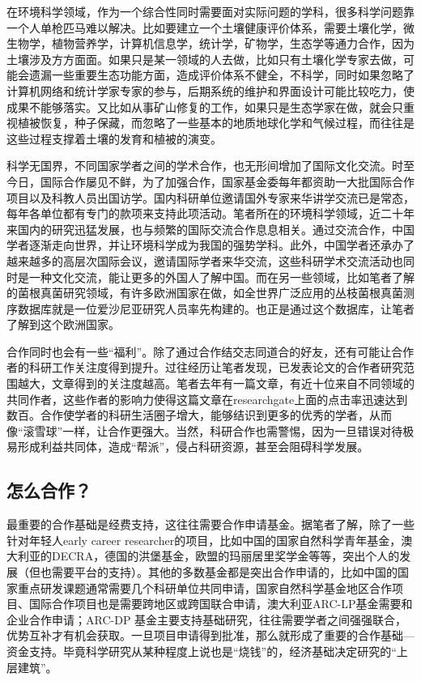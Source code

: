 \documentclass[
]{book}
\begin{document}
在环境科学领域，作为一个综合性同时需要面对实际问题的学科，很多科学问题靠一个人单枪匹马难以解决。比如要建立一个土壤健康评价体系，需要土壤化学，微生物学，植物营养学，计算机信息学，统计学，矿物学，生态学等通力合作，因为土壤涉及方方面面。如果只是某一领域的人去做，比如只有土壤化学专家去做，可能会遗漏一些重要生态功能方面，造成评价体系不健全，不科学，同时如果忽略了计算机网络和统计学家专家的参与，后期系统的维护和界面设计可能比较吃力，使成果不能够落实。又比如从事矿山修复的工作，如果只是生态学家在做，就会只重视植被恢复，种子保藏，而忽略了一些基本的地质地球化学和气候过程，而往往是这些过程支撑着土壤的发育和植被的演变。

科学无国界，不同国家学者之间的学术合作，也无形间增加了国际文化交流。时至今日，国际合作屡见不鲜，为了加强合作，国家基金委每年都资助一大批国际合作项目以及科教人员出国访学。国内科研单位邀请国外专家来华讲学交流已是常态，每年各单位都有专门的款项来支持此项活动。笔者所在的环境科学领域，近二十年来国内的研究迅猛发展，也与频繁的国际交流合作息息相关。通过交流合作，中国学者逐渐走向世界，并让环境科学成为我国的强势学科。此外，中国学者还承办了越来越多的高层次国际会议，邀请国际学者来华交流，这些科研学术交流活动也同时是一种文化交流，能让更多的外国人了解中国。而在另一些领域，比如笔者了解的菌根真菌研究领域，有许多欧洲国家在做，如全世界广泛应用的丛枝菌根真菌测序数据库就是一位爱沙尼亚研究人员率先构建的。也正是通过这个数据库，让笔者了解到这个欧洲国家。

合作同时也会有一些``福利''。除了通过合作结交志同道合的好友，还有可能让合作者的科研工作关注度得到提升。过往经历让笔者发现，已发表论文的合作者研究范围越大，文章得到的关注度越高。笔者去年有一篇文章，有近十位来自不同领域的共同作者，这些作者的影响力使得这篇文章在researchgate上面的点击率迅速达到数百。合作使学者的科研生活圈子增大，能够结识到更多的优秀的学者，从而像``滚雪球''一样，让合作更强大。当然，科研合作也需警惕，因为一旦错误对待极易形成利益共同体，造成``帮派''，侵占科研资源，甚至会阻碍科学发展。

\hypertarget{ux600eux4e48ux5408ux4f5c}{%
\subsection{怎么合作？}\label{ux600eux4e48ux5408ux4f5c}}

最重要的合作基础是经费支持，这往往需要合作申请基金。据笔者了解，除了一些针对年轻人early career researcher的项目，比如中国的国家自然科学青年基金，澳大利亚的DECRA，德国的洪堡基金，欧盟的玛丽居里奖学金等等，突出个人的发展（但也需要平台的支持）。其他的多数基金都是突出合作申请的，比如中国的国家重点研发课题通常需要几个科研单位共同申请，国家自然科学基金地区合作项目、国际合作项目也是需要跨地区或跨国联合申请，澳大利亚ARC-LP基金需要和企业合作申请；ARC-DP 基金主要支持基础研究，往往需要学者之间强强联合，优势互补才有机会获取。一旦项目申请得到批准，那么就形成了重要的合作基础---资金支持。毕竟科学研究从某种程度上说也是``烧钱''的，经济基础决定研究的``上层建筑''。
\end{document}
